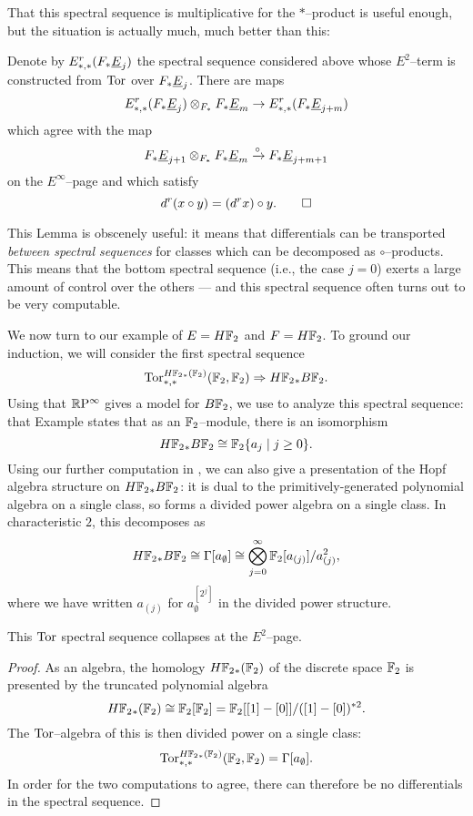 That this spectral sequence is multiplicative for the $\ast$--product is useful enough, but the situation is actually much, much better than this:
\begin{lemma}\label{CircProductAndDifferentials}
Denote by $E^r_{*, *}(F_* \underline{\smash{E}}_{j})$ the spectral sequence considered above whose $E^2$--term is constructed from $\operatorname{Tor}$ over $F_* \underline{\smash{E}}_{j}$.  There are maps \[E^r_{*, *}(F_* \underline{\smash{E}}_{j}) \otimes_{F_*} F_* \underline{\smash{E}}_{m} \to E^r_{*, *}(F_* \underline{\smash{E}}_{j+m})\] which agree with the map \[F_* \underline{\smash{E}}_{j+1} \otimes_{F_*} F_* \underline{\smash{E}}_{m} \xrightarrow{\circ} F_* \underline{\smash{E}}_{j+m+1}\] on the $E^\infty$--page and which satisfy \[d^r(x \circ y) = (d^r x) \circ y. \qed\]
\end{lemma}
\noindent This Lemma is obscenely useful: it means that differentials can be transported \emph{between spectral sequences} for classes which can be decomposed as $\circ$--products.  This means that the bottom spectral sequence (i.e., the case $j = 0$) exerts a large amount of control over the others --- and this spectral sequence often turns out to be very computable.

We now turn to our example of $E = H\mathbb F_2$ and $F = H\mathbb F_2$.  To ground our induction, we will consider the first spectral sequence \[\operatorname{Tor}^{H\mathbb F_2{}_*(\mathbb F_2)}_{*, *}(\mathbb F_2, \mathbb F_2) \Rightarrow H\mathbb F_2{}_* B\mathbb F_2.\]  Using that $\mathbb R\mathrm P^\infty$ gives a model for $B\mathbb F_2$, we use  to analyze this spectral sequence: that Example states that as an $\mathbb F_2$--module, there is an isomorphism \[H\mathbb F_2{}_* B\mathbb F_2 \cong \mathbb F_2\{a_j \mid j \ge 0\}.\]  Using our further computation in , we can also give a presentation of the Hopf algebra structure on $H\mathbb F_2{}_* B\mathbb F_2$: it is dual to the primitively-generated polynomial algebra on a single class, so forms a divided power algebra on a single class.  In characteristic $2$, this decomposes as \[H\mathbb F_2{}_* B\mathbb F_2 \cong \Gamma[a_\emptyset] \cong \bigotimes_{j=0}^\infty \mathbb F_2[a_{(j)}] / a_{(j)}^2,\] where we have written $a_{(j)}$ for $a_\emptyset^{[2^j]}$ in the divided power structure.

\begin{corollary}
This $\operatorname{Tor}$ spectral sequence collapses at the $E^2$--page.
\end{corollary}
\begin{proof}
As an algebra, the homology $H\mathbb F_2{}_*(\mathbb F_2)$ of the discrete space $\mathbb F_2$ is presented by the truncated polynomial algebra \[H\mathbb F_2{}_*(\mathbb F_2) \cong \mathbb F_2[\mathbb F_2] = \mathbb F_2[[1] - [0]] / ([1] - [0])^{\ast 2}.\]  The $\operatorname{Tor}$--algebra of this is then divided power on a single class: \[\operatorname{Tor}^{H\mathbb F_2{}_*(\mathbb F_2)}_{*, *}(\mathbb F_2, \mathbb F_2) = \Gamma[a_\emptyset].\]  In order for the two computations to agree, there can therefore be no differentials in the spectral sequence.
\end{proof}

